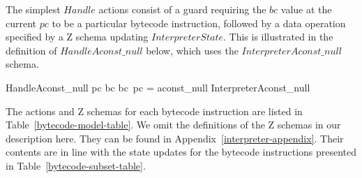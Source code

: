 The simplest $Handle$ actions consist of a guard requiring the $bc$
value at the current $pc$ to be a particular bytecode instruction,
followed by a data operation specified by a Z schema updating
$InterpreterState$.
This is illustrated in the definition of $HandleAconst\_null$ below,
which uses the $InterpreterAconst\_null$ schema.
\begin{circusaction}
  HandleAconst\_null \circdef \lcircguard pc \in\dom bc \land bc~pc = aconst\_null \rcircguard \circguard \lschexpract InterpreterAconst\_null \rschexpract
\end{circusaction}
The \Circus{} actions and Z schemas for each bytecode instruction are
listed in Table~\ref{bytecode-model-table}.
We omit the definitions of the Z schemas in our description here.
They can be found in Appendix~\ref{interpreter-appendix}.
Their contents are in line with the state updates for the bytecode
instructions presented in Table~\ref{bytecode-subset-table}.

